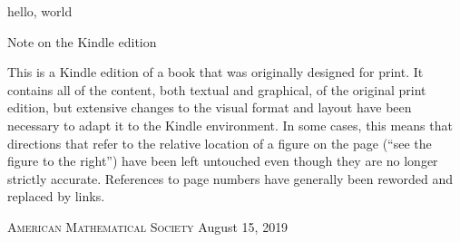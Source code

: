 \documentclass{amsbook}
\begin{document}
hello, world

\begin{BITSnote}{Note on the Kindle edition}

This is a Kindle edition of a book that was originally designed for
print.  It contains all of the content, both textual and graphical, of
the original print edition, but extensive changes to the visual format
and layout have been necessary to adapt it to the Kindle environment.
In some cases, this means that directions that refer to the relative
location of a figure on the page (“see the figure to the right”) have
been left untouched even though they are no longer strictly accurate.
References to page numbers have generally been reworded and replaced
by links.

\begin{flushleft}
\textsc{American Mathematical Society}
August 15, 2019
\end{flushleft}

\end{BITSnote}
\end{document}
